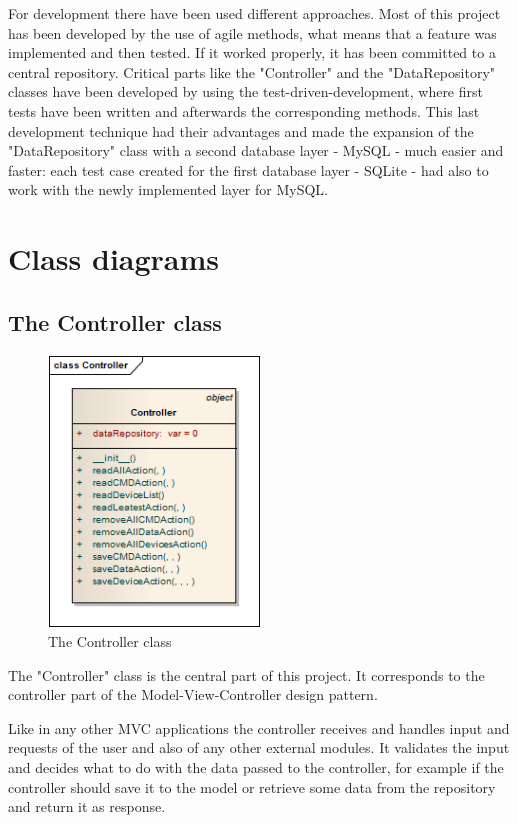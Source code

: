 For development there have been used different approaches. Most of this project has been developed by the use of agile methods, what means that a feature was implemented and then tested. If it worked properly, it has been committed to a central repository. Critical parts like the "Controller" and the "DataRepository" classes have been developed by using the test-driven-development, where first tests have been written and afterwards the corresponding methods. This last development technique had their advantages and made the expansion of the "DataRepository" class with a second database layer - MySQL - much easier and faster: each test case created for the first database layer - SQLite - had also to work with the newly implemented layer for MySQL.

\section{Class diagrams}
\subsection{The Controller class}
\begin{figure}[H]
   \centering
   \includegraphics[width=0.5\textwidth]{pic/Controller.png}%
   \caption{The Controller class}
   \label{Controllerpic}%
\end{figure}

The "Controller" class is the central part of this project. It corresponds to the controller part of the Model-View-Controller design pattern.

Like in any other MVC applications the controller receives and handles input and requests of the user and also of any other external modules. 
It validates the input and decides what to do with the data passed to the controller, for example if the controller should save it to the model or retrieve some data from the repository and return it as response.

